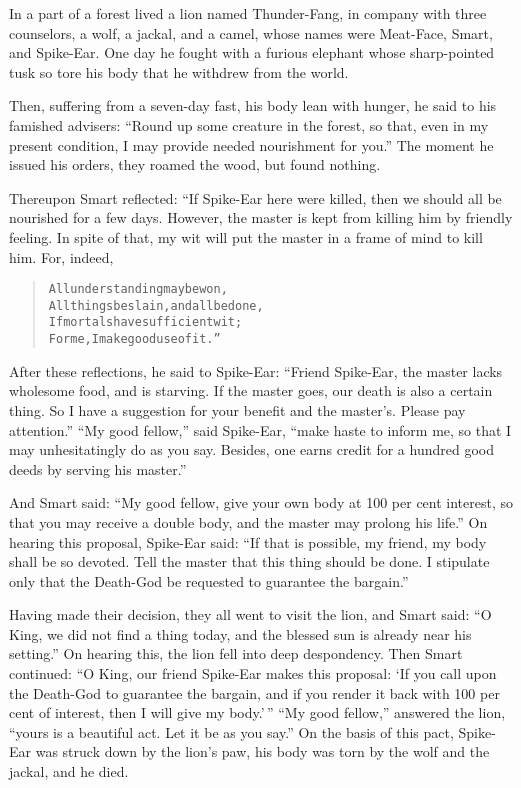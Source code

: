 \documentclass[article, twoside, 14pt]{memoir}
\renewenvironment{verbatim}{%
\begin{quote}%
\vskip -10pt%
\begin{alltt}\normalfont\large}{\end{alltt}%
\end{quote}%
\vskip -10pt
} %
\begin{document}
In a part of a forest lived a lion named Thunder-Fang, in company
with three counselors, a wolf, a jackal, and a camel, whose names
were Meat-Face, Smart, and Spike-Ear. One day he fought with a
furious elephant whose sharp-pointed tusk so tore his body that he
withdrew from the world.

Then, suffering from a seven-day fast, his body lean with hunger,
he said to his famished advisers:
``Round up some creature in the forest, so that, even in my present condition, I may provide needed nourishment for you.''
The moment he issued his orders, they roamed the wood, but found
nothing.

Thereupon Smart reflected: “If Spike-Ear here were killed, then we
should all be nourished for a few days. However, the master is kept
from killing him by friendly feeling. In spite of that, my wit will
put the master in a frame of mind to kill him. For, indeed,

\begin{verbatim}
All understanding may be won,
All things be slain, and all be done,
If mortals have sufficient wit;
For me, I make good use of it.”
\end{verbatim}
After these reflections, he said to Spike-Ear:
``Friend Spike-Ear, the master lacks wholesome food, and is starving. If the master goes, our death is also a certain thing. So I have a suggestion for your benefit and the master's. Please pay attention.''
``My good fellow,'' said Spike-Ear,
``make haste to inform me, so that I may unhesitatingly do as you say. Besides, one earns credit for a hundred good deeds by serving his master.''

And Smart said:
``My good fellow, give your own body at 100 per cent interest, so that you may receive a double body, and the master may prolong his life.''
On hearing this proposal, Spike-Ear said:
``If that is possible, my friend, my body shall be so devoted. Tell the master that this thing should be done. I stipulate only that the Death-God be requested to guarantee the bargain.''

Having made their decision, they all went to visit the lion, and
Smart said:
``O King, we did not find a thing today, and the blessed sun is already near his setting.''
On hearing this, the lion fell into deep despondency. Then Smart
continued:
``O King, our friend Spike-Ear makes this proposal: `If you call upon the Death-God to guarantee the bargain, and if you render it back with 100 per cent of interest, then I will give my body.'\,''
``My good fellow,'' answered the lion,
``yours is a beautiful act. Let it be as you say.'' On the basis of
this pact, Spike-Ear was struck down by the lion's paw, his body
was torn by the wolf and the jackal, and he died.
\end{document}
